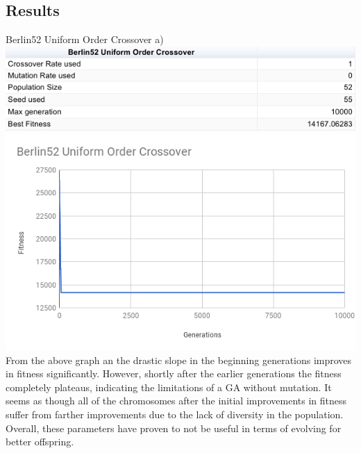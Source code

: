 \documentclass[conference]{IEEEtran}
\begin{document}
\subsection{Results}

Berlin52 Uniform Order Crossover a)
\includegraphics[scale=0.42]{Berlin52/UOC/Berlin52_UOC_a)_table}
\includegraphics[scale=0.42]{Berlin52/UOC/Berlin52_UOC_a)}
From the above graph an the drastic slope in the beginning generations improves in fitness significantly. However, shortly after the earlier generations the fitness completely plateaus, indicating the limitations of a GA without mutation. It seems as though all of the chromosomes after the initial improvements in fitness suffer from farther improvements due to the lack of diversity in the population. Overall, these parameters have proven to not be useful in terms of evolving for better offspring.
\end{document}

